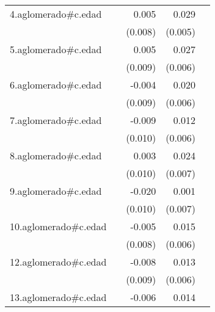 {\begin{longtable}{l*{4}{D{.}{.}{-1}}}
\addlinespace
4.aglomerado#c.edad&                     &       0.005         &       0.029\sym{***}&                     \\
            &                     &     (0.008)         &     (0.005)         &                     \\
\addlinespace
5.aglomerado#c.edad&                     &       0.005         &       0.027\sym{***}&                     \\
            &                     &     (0.009)         &     (0.006)         &                     \\
\addlinespace
6.aglomerado#c.edad&                     &      -0.004         &       0.020\sym{**} &                     \\
            &                     &     (0.009)         &     (0.006)         &                     \\
\addlinespace
7.aglomerado#c.edad&                     &      -0.009         &       0.012         &                     \\
            &                     &     (0.010)         &     (0.006)         &                     \\
\addlinespace
8.aglomerado#c.edad&                     &       0.003         &       0.024\sym{***}&                     \\
            &                     &     (0.010)         &     (0.007)         &                     \\
\addlinespace
9.aglomerado#c.edad&                     &      -0.020\sym{*}  &       0.001         &                     \\
            &                     &     (0.010)         &     (0.007)         &                     \\
\addlinespace
10.aglomerado#c.edad&                     &      -0.005         &       0.015\sym{**} &                     \\
            &                     &     (0.008)         &     (0.006)         &                     \\
\addlinespace
12.aglomerado#c.edad&                     &      -0.008         &       0.013\sym{*}  &                     \\
            &                     &     (0.009)         &     (0.006)         &                     \\
\addlinespace
13.aglomerado#c.edad&                     &      -0.006         &       0.014\sym{**} &                     \\

\end{longtable}}
